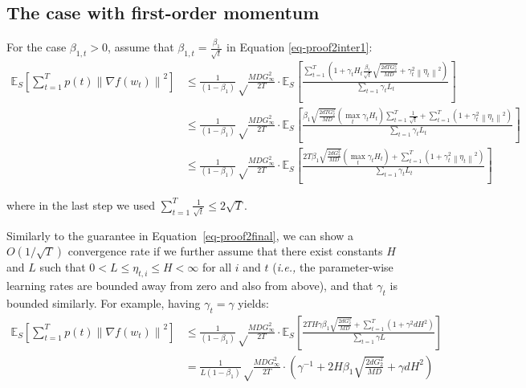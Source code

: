 \documentclass{article}
\newcommand{\ie}{\textit{i.e.,} }
\newcommand{\norm}[1]{\left\lVert{#1}\right\rVert}
\newcommand{\currw}{w_t}
\newcommand{\curre}{\eta_t}
\newcommand{\currei}{\eta_{t,i}}
\newcommand{\normed}[1]{\left\lVert {#1} \right\rVert}
\newcommand{\bone}{\beta_1}
\newcommand{\bonet}{\beta_{1,t}}
\newcommand{\fdist}{D}
\newcommand{\smooth}{M}
\newcommand{\lowinf}{L}
\newcommand{\lowinft}{L_{t}}
\newcommand{\highinf}{H}
\newcommand{\highinft}{H_{t}}
\newcommand{\gradb}{G_\infty}
\newcommand{\gradbtwo}{G_2}
\newcommand{\expec}[2]{\mathbb E_{#1} \left[ {#2} \right]}
\begin{document}
\subsection{The case with first-order momentum}
\label{sec:proof2-momentum}
For the case $\bonet > 0$, assume that $\bonet = \frac{\bone}{\sqrt t}$ in Equation \ref{eq-proof2inter1}:
\begin{equation}
\begin{split}
     \expec{S}{\sum_{t=1}^T p(t) \normed{\nabla f(\currw)}^2} & \leq \frac{1}{(1-\bone)} \sqrt\frac{\smooth \fdist \gradb^2}{2T} \cdot \expec{S}{\frac{\sum_{t=1}^T \left(1 + \gamma_t \highinft \frac{\bone}{\sqrt t} \sqrt{\frac{2 d T \gradbtwo^2}{ \smooth D}} + \gamma_t^2 \norm{\curre}^2 \right)}{\sum_{t=1} \gamma_t \lowinft}} \\
     & \leq \frac{1}{(1-\bone)} \sqrt\frac{\smooth \fdist \gradb^2}{2T} \cdot \expec{S}{\frac{\bone \sqrt{\frac{2 d T \gradbtwo^2}{ \smooth D}} \left(\max_t \gamma_t \highinft \right) \sum_{t=1}^T \frac{1}{\sqrt t} + \sum_{t=1}^T \left(1 + \gamma_t^2 \norm{\curre}^2 \right)}{\sum_{t=1} \gamma_t \lowinft}} \\   
     & \leq \frac{1}{(1-\bone)} \sqrt\frac{\smooth \fdist \gradb^2}{2T} \cdot \expec{S}{\frac{2 T \bone \sqrt{\frac{2 d \gradbtwo^2}{ \smooth D}} \left(\max_t \gamma_t \highinft \right) + \sum_{t=1}^T \left(1 + \gamma_t^2 \norm{\curre}^2 \right)}{\sum_{t=1} \gamma_t \lowinft}}
\end{split}
\end{equation}

where in the last step we used $\sum_{t=1}^T \frac1{\sqrt t} \leq 2 \sqrt T$.

Similarly to the guarantee in Equation~\ref{eq-proof2final}, we can show a $O(1 / \sqrt T)$ convergence rate if we further assume that there exist constants $\highinf$ and $\lowinf$ such that
$0 < \lowinf \leq \currei \leq \highinf < \infty$ for all $i$ and $t$ (\ie the parameter-wise learning rates are bounded away from zero and also from above), and that $\gamma_t$ is bounded similarly. For example, having $\gamma_t = \gamma$ yields:
\begin{equation}
\begin{split}
     \expec{S}{\sum_{t=1}^T p(t) \normed{\nabla f(\currw)}^2} & \leq \frac{1}{(1-\bone)} \sqrt\frac{\smooth \fdist \gradb^2}{2T} \cdot \expec{S}{\frac{2 T \highinf \gamma \bone  \sqrt{\frac{2 d \gradbtwo^2}{ \smooth D}} + \sum_{t=1}^T \left(1 + \gamma^2 d \highinf^2 \right)}{\sum_{t=1} \gamma \lowinf}} \\
     & = \frac{1}{\lowinf (1-\bone)} \sqrt\frac{\smooth \fdist \gradb^2}{2T} \cdot \left(\gamma^{-1} + 2 \highinf \bone  \sqrt{\frac{2 d \gradbtwo^2}{ \smooth D}} + \gamma d \highinf^2 \right)
\end{split}
\end{equation}
\end{document}
